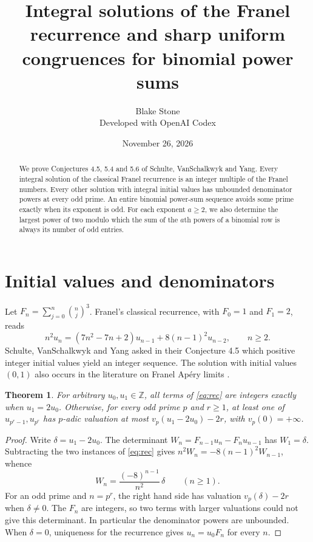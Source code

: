 \documentclass[10pt]{article}
\title{Integral solutions of the Franel recurrence and sharp uniform congruences for binomial power sums}
\author{Blake Stone\\\small Developed with OpenAI Codex}
\date{November 26, 2026}
\newtheorem{theorem}{Theorem}
\begin{document}
\maketitle
\begin{abstract}
We prove Conjectures 4.5, 5.4 and 5.6 of Schulte, VanSchalkwyk and Yang.
Every integral solution of the classical Franel recurrence is an integer
multiple of the Franel numbers. Every other solution with integral initial
values has unbounded denominator powers at every odd prime. An entire binomial power-sum sequence avoids some prime exactly when its exponent is odd. For each
exponent $a\ge2$, we also determine the largest power of two modulo which
the sum of the $a$th powers of a binomial row is always its number of odd
entries.
\end{abstract}
\section{Initial values and denominators}
Let $F_n=\sum_{j=0}^n\binom{n}{j}^{3}$. Franel's classical recurrence,
with $F_0=1$ and $F_1=2$, reads
\begin{equation}
 n^2u_n=(7n^2-7n+2)u_{n-1}+8(n-1)^2u_{n-2},\qquad n\ge2.
 \label{eq:rec}
\end{equation}
Schulte, VanSchalkwyk and Yang \cite{report} asked in their Conjecture 4.5
which positive integer initial values yield an integer sequence. The
solution with initial values $(0,1)$ also occurs in the literature on
Franel Ap\'ery limits \cite{apery}.

\begin{theorem}
For arbitrary $u_0,u_1\in\mathbb Z$, all terms of \eqref{eq:rec} are
integers exactly when $u_1=2u_0$. Otherwise, for every odd prime $p$
and $r\ge1$, at least one of $u_{p^r-1},u_{p^r}$ has $p$-adic
valuation at most $v_p(u_1-2u_0)-2r$, with $v_p(0)=+\infty$.
\end{theorem}
\begin{proof}
Write $\delta=u_1-2u_0$. The determinant
$W_n=F_{n-1}u_n-F_nu_{n-1}$ has $W_1=\delta$.
Subtracting the two instances of \eqref{eq:rec} gives
$n^2 W_n=-8(n-1)^2W_{n-1}$, whence
\begin{equation}
 W_n=\frac{(-8)^{n-1}}{n^2}\,\delta\qquad(n\ge1).
 \label{eq:wronskian}
\end{equation}
For an odd prime and $n=p^r$, the right hand side has valuation
$v_p(\delta)-2r$ when $\delta\ne0$. The $F_n$ are integers, so two
terms with larger valuations could not give this determinant.
In particular the denominator powers are unbounded. When $\delta=0$,
uniqueness for the recurrence gives $u_n=u_0F_n$ for every $n$.
\end{proof}
\end{document}
